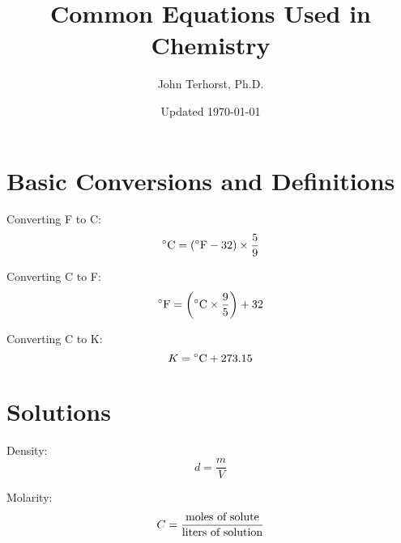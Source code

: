 \documentclass[10pt]{article}
\title{Common Equations Used in Chemistry}
\author{John Terhorst, Ph.D.}
\date{Updated \today}
\begin{document}

\maketitle
\tableofcontents


\newpage\section{Basic Conversions and Definitions}

Converting \deg F to \deg C:
\begin{equation*}
\textnormal{\deg C} = (\textnormal{\deg F}-32)\times \frac{5}{9}
\end{equation*}

Converting \deg C to \deg F:
\begin{equation*}
\textnormal{\deg F} = \left(\textnormal{\deg C}\times \frac{9}{5}\right) +32
\end{equation*}

Converting \deg C to K:
\begin{equation*}
K = \textnormal{\deg C}+273.15
\end{equation*}


\section{Solutions}

Density:
\begin{equation*}
d = \frac{m}{V}
\end{equation*}

Molarity:
\begin{equation*}
C = \frac{\textnormal{moles of solute}}{\textnormal{liters of solution}}
\end{equation*}
\end{document}
